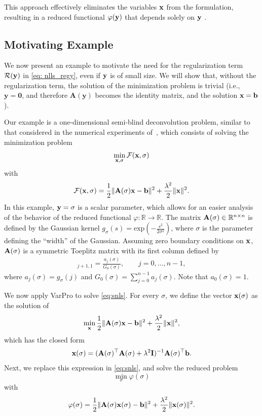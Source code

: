 \documentclass[onefignum,onetabnum]{siamart171218}
\newcommand{\bA}{{\bf A}}
\newcommand{\bI}{{\bf I}}
\newcommand{\bb}{{\bf b}}
\newcommand{\bx}{{\bf x}}
\newcommand{\by}{{\bf y}}
\newcommand{\calF}{\mathcal{F}}
\begin{document}
This approach effectively eliminates the variables $\bx$ from the formulation, resulting in a reduced functional $\varphi(\by)$ that depends solely on $\by$%
.

\subsection{Motivating Example}\label{sec: motivating example}
We %
now present an example to motivate the need for the regularization term $\mathcal{R}(\by)$ in \eqref{eq: nlls_regy}, even if $\by$ is of small size. We will show that, without the regularization term, the solution of the minimization problem is trivial (i.e., $\mathbf{y}=\boldsymbol{0}$, and therefore $\mathbf{A}(\mathbf{y})$ becomes the identity matrix, and the solution $\bx=\bb$). 

Our example is a one-dimensional semi-blind deconvolution problem, similar to that considered in the numerical experiments of~\cite{Espanol_2023}, which consists of solving the minimization problem
\begin{equation}\label{eq:snls}
\min_{\bx, \sigma}  \calF(\bx,\sigma) 
\end{equation}
with $$\calF(\bx,\sigma) = \frac{1}{2}\| \bA(\sigma)\bx - \bb \|^2 + \frac{\lambda^2}{2} \|\bx\|^2.$$
In this example, $\by = \sigma$ is a scalar parameter, which allows for an easier analysis of the behavior of the reduced functional $\varphi\colon \mathbb{R} \to \mathbb{R}$. The matrix $\bA(\sigma)\in \mathbb{R}^{n\times n}$ is defined by the Gaussian kernel
$g_\sigma(s) = \mbox{exp}\left(-\frac{s^2}{2\sigma^2}\right)$, where $\sigma$ is the parameter defining the ``width'' of the Gaussian. Assuming zero boundary conditions on $\bx$, $\bA(\sigma)$ is a symmetric Toeplitz matrix with its first column defined by
\begin{align}
   [\bA(\sigma)]_{j+1,1}= \frac{a_j(\sigma)}{G_0(\sigma)}  , \qquad j=0, \dots, n-1,\nonumber
\end{align}
where $a_j(\sigma)=g_\sigma(j)$ and  $G_0(\sigma) = \sum_{j=0}^{n-1} a_j(\sigma)$. Note that $a_0(\sigma)=1$.

We now apply VarPro to solve \eqref{eq:snls}. For every $\sigma$, we define the vector $\bx(\sigma)$ as the solution of
\[ \min_{\bx} \frac{1}{2}\|\bA(\sigma) \bx - \bb \|^2 + \frac{\lambda^2}{2}\| \bx\|^2,\]
which has the closed form
\[\bx(\sigma) = (\bA(\sigma)^\top \bA(\sigma) + \lambda^2 \bI)^{-1} \bA(\sigma)^\top \bb.\]
Next, we  replace this expression  in \eqref{eq:snls}, and solve the reduced problem
\begin{equation*}
\min_\sigma  \varphi(\sigma) 
\end{equation*}
with 
\begin{equation}\label{eq: Tik-problem}
\varphi(\sigma) = \frac{1}{2}\|\bA(\sigma) \bx(\sigma) - \bb\|^2 + \frac{\lambda^2}{2} \| \bx(\sigma)\|^2.
\end{equation}
\end{document}
